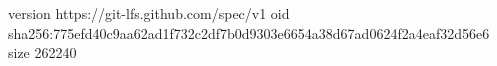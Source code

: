 version https://git-lfs.github.com/spec/v1
oid sha256:775efd40c9aa62ad1f732c2df7b0d9303e6654a38d67ad0624f2a4eaf32d56e6
size 262240
